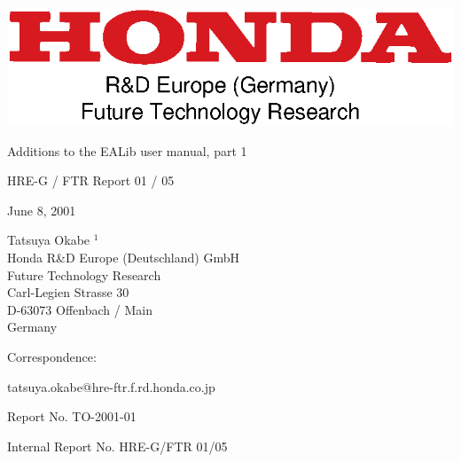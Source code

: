 \begin{center}
\includegraphics{honda-ftr.eps}

\vspace*{70pt}
{\LARGE
Additions to the EALib user manual, part 1}\\

\vspace*{10mm}

HRE-G / FTR Report 01 / 05\\

\vspace*{30mm}

June 8, 2001\\

\vspace*{30mm}

Tatsuya Okabe $^1$\\

Honda R\&D Europe (Deutschland) GmbH\\
Future Technology Research\\
Carl-Legien Strasse 30\\
D-63073 Offenbach / Main\\
Germany\\

\vspace*{30mm}

\end{center}

\noindent
Correspondence:

\noindent
tatsuya.okabe@hre-ftr.f.rd.honda.co.jp

\clearpage

\noindent
Report No. TO-2001-01

\noindent
Internal Report No. HRE-G/FTR 01/05